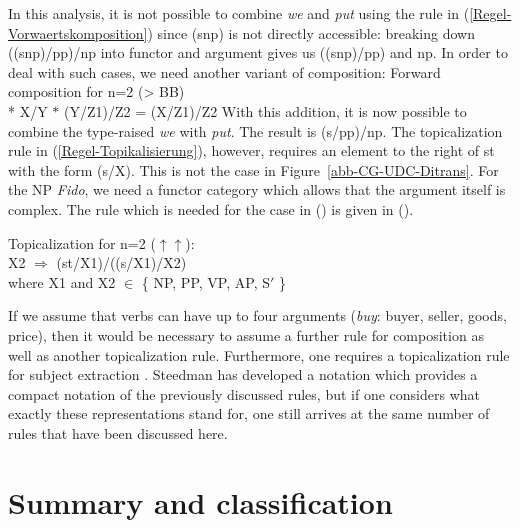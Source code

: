 In this analysis, it is not possible to combine \emph{we} and \emph{put} using the rule in
(\ref{Regel-Vorwaertskomposition}) since (s\bs np) is not directly accessible: 
breaking down ((s\bs np)/pp)/np into functor and argument gives us ((s\bs np)/pp) and np. 
In order to deal with such cases, we need another variant of composition:
\pagebreak
\ea
Forward composition for n=2 (> BB)\\*
X/Y $*$ (Y/Z1)/Z2 = (X/Z1)/Z2
\z
With this addition, it is now possible to combine the type-raised \emph{we} with \emph{put}. The result is (s/pp)/np.
The topicalization rule in (\ref{Regel-Topikalisierung}), however, requires an element to the right of st with the form
(s/X). This is not the case in Figure~\ref{abb-CG-UDC-Ditrans}. For the NP \emph{Fido}, we need a functor category
which allows that the argument itself is complex. The rule which is needed for the case in
() is given in ().

\ea
\label{Regel-Topikalisierung-zwei}
Topicalization for n=2 ($\uparrow\uparrow$\is{$\uparrow\uparrow$}):\\
X2 $\Rightarrow$ (st/X1)/((s/X1)/X2)\\
where X1 and X2 $\in$ \{ NP, PP, VP, AP, S$'$ \}
\z

\noindent
If we assume that verbs can have up to four arguments (\zb \emph{buy}: buyer,
seller, goods, price), then it would be necessary to assume a further rule for composition as well as another topicalization rule.
Furthermore, one requires a topicalization rule for subject extraction \citep[]{Pollard88a}. Steedman has developed a notation which
provides a compact notation of the previously discussed rules, but if one considers what exactly these representations stand for, one still arrives at the
same number of rules that have been discussed here.%

\section{Summary and classification}
\label{Abschnitt-Relativsaetze-CG}\label{Abschnitt-Ratte-CG}\label{sec-pied-piping-cg}

